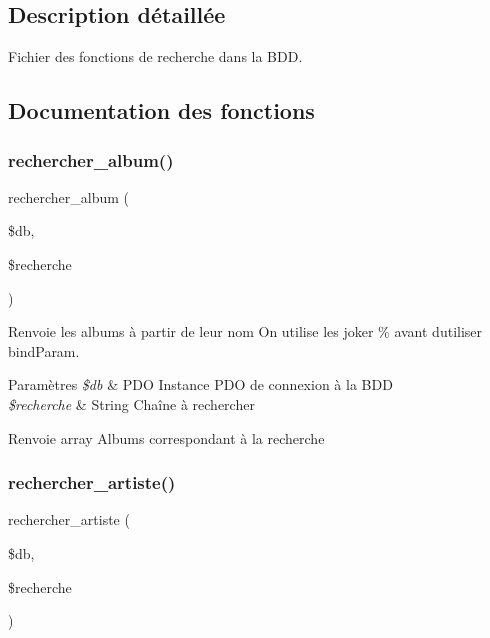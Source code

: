 \subsection{Description détaillée}
Fichier des fonctions de recherche dans la B\+DD. 



\subsection{Documentation des fonctions}
\mbox{\label{fonctionRecherche_8php_a83ea610ab61d5e40930cc7ce08d7f3cd}} 
\subsubsection{\texorpdfstring{rechercher\+\_\+album()}{rechercher\_album()}}
{\footnotesize\ttfamily rechercher\+\_\+album (\begin{DoxyParamCaption}\item[{}]{\$db,  }\item[{}]{\$recherche }\end{DoxyParamCaption})}



Renvoie les albums à partir de leur nom On utilise les joker \% avant d\textquotesingle{}utiliser bind\+Param. 


\begin{DoxyParams}{Paramètres}
{\em \$db} & P\+DO Instance P\+DO de connexion à la B\+DD \\
\hline
{\em \$recherche} & String Chaîne à rechercher \\
\hline
\end{DoxyParams}
\begin{DoxyReturn}{Renvoie}
array Albums correspondant à la recherche 
\end{DoxyReturn}
\mbox{\label{fonctionRecherche_8php_a498b02bfe9256ba9d482522c56f9d7e7}} 
\subsubsection{\texorpdfstring{rechercher\+\_\+artiste()}{rechercher\_artiste()}}
{\footnotesize\ttfamily rechercher\+\_\+artiste (\begin{DoxyParamCaption}\item[{}]{\$db,  }\item[{}]{\$recherche }\end{DoxyParamCaption})}




